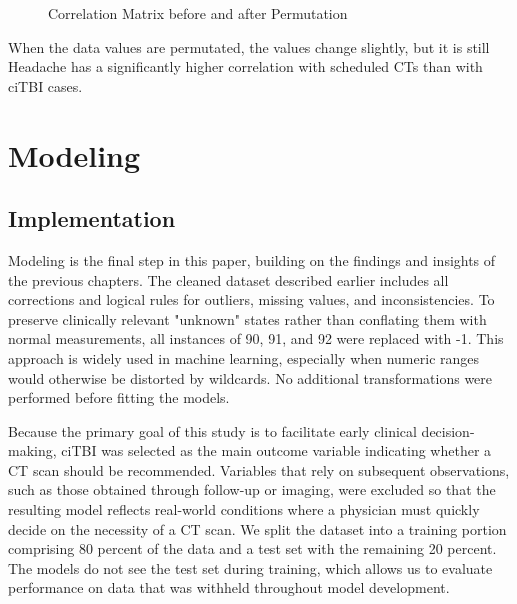 \documentclass[10pt,letterpaper]{article}
\begin{document}
\begin{figure}[H]
    \centering
    \caption{Correlation Matrix before and after Permutation}
    \label{fig:stability_check}
\end{figure}

When the data values are permutated, the values change slightly, but it is still Headache has a significantly higher correlation with scheduled CTs than with ciTBI cases.

\section{Modeling}

\subsection{Implementation}

Modeling is the final step in this paper, building on the findings and insights of the previous chapters. The cleaned dataset described earlier includes all corrections and logical rules for outliers, missing values, and inconsistencies. To preserve clinically relevant "unknown" states rather than conflating them with normal measurements, all instances of 90, 91, and 92 were replaced with -1. This approach is widely used in machine learning, especially when numeric ranges would otherwise be distorted by wildcards. No additional transformations were performed before fitting the models.

Because the primary goal of this study is to facilitate early clinical decision-making, ciTBI was selected as the main outcome variable indicating whether a CT scan should be recommended. Variables that rely on subsequent observations, such as those obtained through follow-up or imaging, were excluded so that the resulting model reflects real-world conditions where a physician must quickly decide on the necessity of a CT scan. We split the dataset into a training portion comprising 80 percent of the data and a test set with the remaining 20 percent. The models do not see the test set during training, which allows us to evaluate performance on data that was withheld throughout model development.
\end{document}
